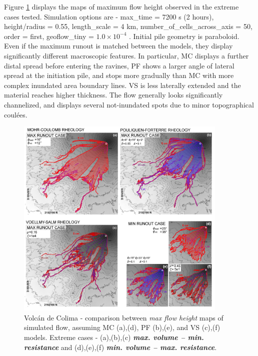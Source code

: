 \documentclass{article}
\begin{document}
Figure \ref{Colima-MaxMinExtents} displays the maps of maximum flow height observed in the extreme cases tested. Simulation options are - max\_time = 7200 s (2 hours), height/radius = 0.55, length\_scale = 4 km, number\_of\_cells\_across\_axis = 50, order = first, geoflow\_tiny = $1.0\times 10^{-4}$ \citep{Patra2005,Aghakhani2016}. Initial pile geometry is paraboloid. Even if the maximum runout is matched between the models, they display significantly different macroscopic features. In particular, MC displays a further distal spread before entering the ravines, PF shows a larger angle of lateral spread at the initiation pile, and stops more gradually than MC with more complex inundated area boundary lines. VS is less laterally extended and the material reaches higher thickness. The flow generally looks significantly channelized, and displays several not-inundated spots due to minor topographical coul\'{e}es.

\begin{figure}[H]
         \centering
        \includegraphics[width=0.90\textwidth]{ExtremeMaps.jpg}
        \caption{Volc\'an de Colima - comparison between \emph{max flow height} maps of simulated flow, assuming MC (a),(d), PF (b),(e), and VS (c),(f) models. Extreme cases - (a),(b),(c) \emph{\textbf{max. volume -- min. resistance}} and (d),(e),(f) \emph{\textbf{min. volume -- max. resistance}}.}
        \label{Colima-MaxMinExtents}
\end{figure}
\end{document}
